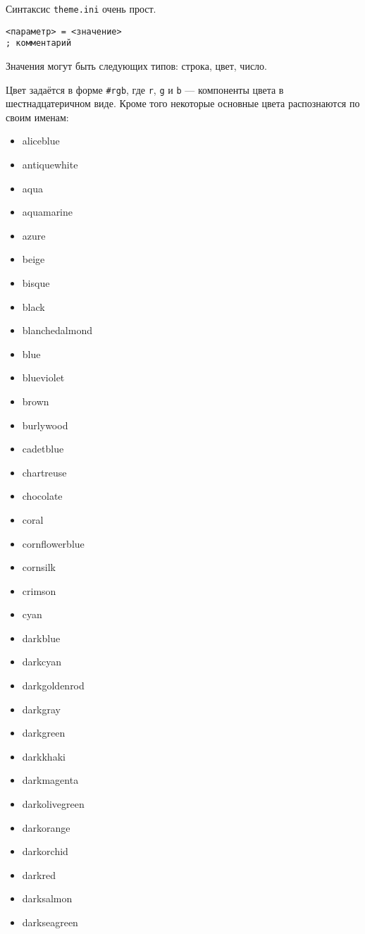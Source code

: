 \documentclass[a4paper,12pt]{article}
\begin{document}
Синтаксис \verb/theme.ini/ очень прост.

\begin{verbatim}
<параметр> = <значение>
; комментарий
\end{verbatim}

Значения могут быть следующих типов: строка, цвет, число.

Цвет задаётся в форме \verb/#rgb/, где \verb/r/, \verb/g/ и \verb/b/ --- компоненты цвета в шестнадцатеричном виде. Кроме того некоторые основные цвета распознаются по своим именам:


\begin{itemize}
\item aliceblue
\item antiquewhite
\item aqua
\item aquamarine
\item azure
\item beige
\item bisque
\item black
\item blanchedalmond
\item blue
\item blueviolet
\item brown
\item burlywood
\item cadetblue
\item chartreuse
\item chocolate
\item coral
\item cornflowerblue
\item cornsilk
\item crimson
\item cyan
\item darkblue
\item darkcyan
\item darkgoldenrod
\item darkgray
\item darkgreen
\item darkkhaki
\item darkmagenta
\item darkolivegreen
\item darkorange
\item darkorchid
\item darkred
\item darksalmon
\item darkseagreen

\end{itemize}
\end{document}
